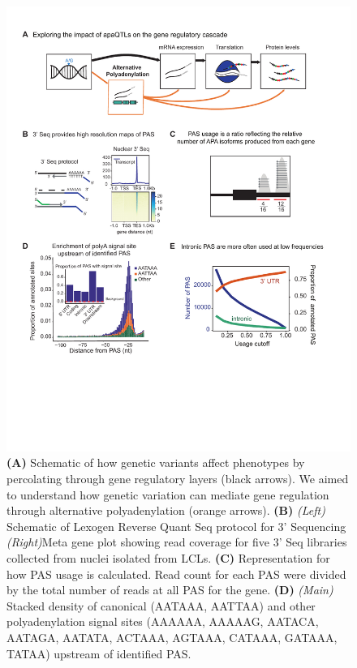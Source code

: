 \begin{figure}
\centering
\includegraphics[width=5in]{img/ch02/figure1_fixed.pdf}
\caption[3' Sequencing of nuclei reliably captures alternative polyadenylation]{\small {\bf (A)} Schematic of how genetic variants affect phenotypes by percolating through gene regulatory layers (black arrows). We aimed to understand how genetic variation can mediate gene regulation through alternative polyadenylation (orange arrows). {\bf (B)} {\it (Left)} Schematic of Lexogen Reverse Quant Seq protocol for 3' Sequencing \citep{moll_quantseq_2014} {\it (Right)}Meta gene plot showing read coverage for five 3' Seq libraries collected from nuclei isolated from LCLs. {\bf (C)} Representation for how PAS usage is calculated. Read count for each PAS were divided by the total number of reads at all PAS for the gene. {\bf (D)} {\it (Main)} Stacked density of canonical (AATAAA, AATTAA) and other polyadenylation signal sites (AAAAAA, AAAAAG, AATACA, AATAGA, AATATA, ACTAAA, AGTAAA, CATAAA, GATAAA, TATAA) upstream of identified PAS.} 
\label{fig:3prime4APA}
\end{figure}


